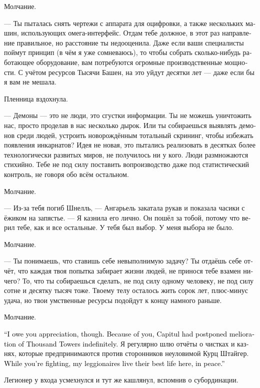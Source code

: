 \documentclass[a4paper,12pt,fleqn]{book}\usepackage{cooltooltips}\usepackage{polyglossia}\setdefaultlanguage[babelshorthands=true]{russian}\setotherlanguage{english}\defaultfontfeatures{Ligatures=TeX,Mapping=tex-text} \usepackage{xcolor}\definecolor{lightgray}{HTML}{bbbbbb}\color{lightgray}\newcommand{\ml}[3]{\textenglish{\textcolor{black}{#3}}}
\begin{document}
Молчание.

--- Ты пыталась снять чертежи с аппарата для оцифровки, а также нескольких машин, использующих омега-интерфейс.
Отдам тебе должное, в этот раз направление правильное, но расстояние ты недооценила.
Даже если ваши специалисты поймут принцип (в чём я уже сомневаюсь), то чтобы собрать сколько-нибудь работающее оборудование, вам потребуются огромные производственные мощности.
С учётом ресурсов Тысячи Башен, на это уйдут десятки лет --- даже если бы я вам не мешала.

Пленница вздохнула.

--- Демоны --- это не люди, это сгустки информации.
Ты не можешь уничтожить нас, просто проделав в нас несколько дырок.
Или ты собираешься выявлять демонов среди людей, устроить новорождённым тотальный скрининг, чтобы избежать появления инкарнатов?
Идея не новая, это пытались реализовать в десятках более технологически развитых миров, не получилось ни у кого.
Люди размножаются стихийно.
Тебе не под силу поставить вопроизводство даже под статистический контроль, не говоря обо всём остальном.

Молчание.

--- Из-за тебя погиб Шнелль, --- Ангарьель закатала рукав и показала часики с ёжиком на запястье.
--- Я казнила его лично.
Он пошёл за тобой, потому что верил тебе, как и все остальные.
У тебя был выбор.
У меня выбора не было.

Молчание.

--- Ты понимаешь, что ставишь себе невыполнимую задачу?
Ты отдаёшь себе отчёт, что каждая твоя попытка забирает жизни людей, не принося тебе взамен ничего?
То, что ты собираешься сделать, не под силу одному человеку, не под силу сотне и десятку тысяч тоже.
Твоему телу осталось жить сорок лет, плюс-минус удача, но твои умственные ресурсы подойдут к концу намного раньше.

Молчание.

\ml{$0$}
{--- Я должна тебя поблагодарить, впрочем.}
{``I owe you appreciation, though.}
\ml{$0$}
{Благодаря тебе Капитул отложил мелиорацию Тысячи Башен на неопределённый срок.}
{Because of you, Capitul had postponed melioration of Thousand Towers indefinitely.}
Я регулярно шлю отчёты о чистках и казнях, которые предпринимаются против сторонников неуловимой Курц Штайгер.
\ml{$0$}
{Пока ты борешься, мои легионеры живут здесь, мирно и счастливо.}
{While you're fighting, my leggionaires live their best life here, in peace.''}

Легионер у входа усмехнулся и тут же кашлянул, вспомнив о субординации.
\end{document}
